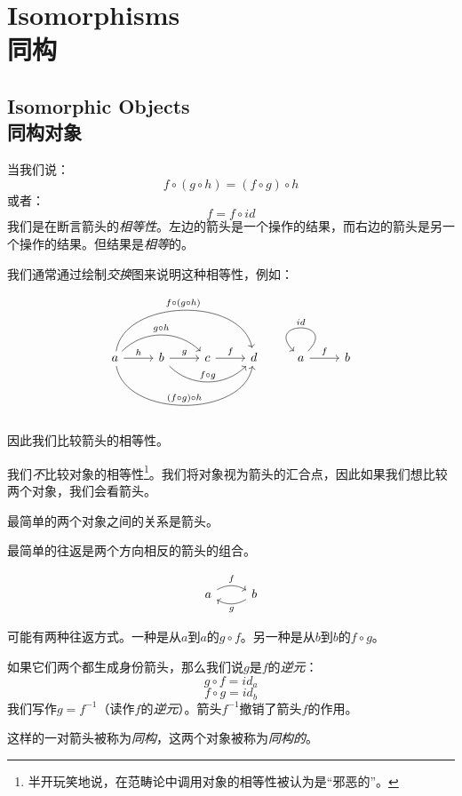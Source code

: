 \documentclass[DaoFP]{subfiles}
\begin{document}
 \setcounter{chapter}{2}

 \chapter{Isomorphisms\\同构}

 \section{Isomorphic Objects\\同构对象}

 当我们说：
 \[f \circ (g \circ h) = (f \circ g) \circ h \]
 或者：
 \[ f = f \circ id \]
 我们是在断言箭头的\emph{相等性}。左边的箭头是一个操作的结果，而右边的箭头是另一个操作的结果。但结果是\emph{相等}的。

 我们通常通过绘制\emph{交换}图来说明这种相等性，例如：

 \[
  \begin{tikzcd}
   a
   \arrow[r, "h"]
   \arrow[rr, bend left=45, "g \circ h"]
   \arrow[rrr, bend left=80, "f \circ (g \circ h)"]
   \arrow[rrr, bend right=80, "(f \circ g) \circ h"]
   & b
   \arrow[r, "g"]
   \arrow[rr, bend right=45, "f \circ g"]
   &c
   \arrow[r, "f"]
   &d
  \end{tikzcd}
  \begin{tikzcd}
   a
   \arrow[r, "f"]
   \arrow[r, loop, "id"']
   &b
  \end{tikzcd}
 \]

 因此我们比较箭头的相等性。

 我们\emph{不}比较对象的相等性\footnote{半开玩笑地说，在范畴论中调用对象的相等性被认为是“邪恶的”。}。我们将对象视为箭头的汇合点，因此如果我们想比较两个对象，我们会看箭头。

 最简单的两个对象之间的关系是箭头。

 最简单的往返是两个方向相反的箭头的组合。

 \[
  \begin{tikzcd}
   a
   \arrow[r, bend left, "f"]
   & b
   \arrow[l, bend left, "g"]
  \end{tikzcd}
 \]

 可能有两种往返方式。一种是从$a$到$a$的$g \circ f$。另一种是从$b$到$b$的$f \circ g$。

 如果它们两个都生成身份箭头，那么我们说$g$是$f$的\emph{逆元}：
 \[ g \circ f = id_a\]
 \[f \circ g = id_b\]
 我们写作$g = f^{-1}$（读作$f$的\emph{逆元}）。箭头$f^{-1}$撤销了箭头$f$的作用。

 这样的一对箭头被称为\emph{同构}，这两个对象被称为\emph{同构的}。
\end{document}
